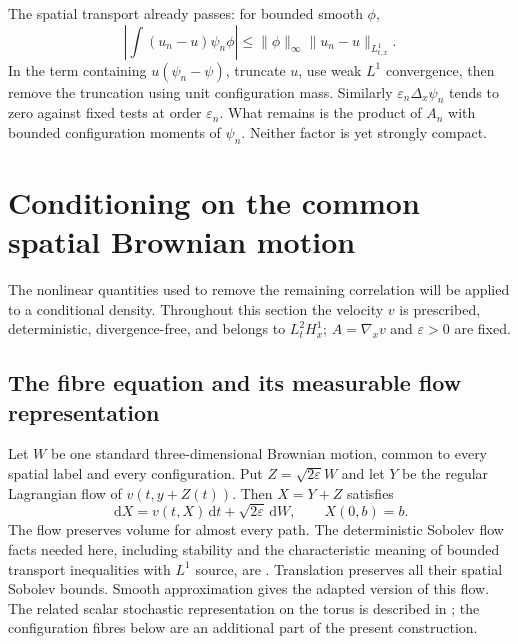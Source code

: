 \documentclass[11pt]{article}
\numberwithin{equation}{section}
\newcommand{\dd}{\,\mathrm d}
\newcommand{\grad}{\nabla}
\begin{document}
The spatial transport already passes: for bounded smooth $\phi$,
\[
 \left|\int(u_n-u)\psi_n\phi\right|\leq
 \|\phi\|_\infty\|u_n-u\|_{L^1_{t,x}}.
\]
In the term containing $u(\psi_n-\psi)$, truncate $u$, use weak $L^1$
convergence, then remove the truncation using unit configuration mass.
Similarly $\varepsilon_n\Delta_x\psi_n$ tends to zero against fixed tests at
order $\varepsilon_n$. What remains is the product of $A_n$ with bounded
configuration moments of $\psi_n$. Neither factor is yet strongly compact.

\section{Conditioning on the common spatial Brownian motion}\label{sec:lift}
The nonlinear quantities used to remove the remaining correlation will be
applied to a conditional density. Throughout this section the velocity $v$ is
prescribed, deterministic, divergence-free, and belongs to $L^2_tH^1_x$;
$A=\grad_xv$ and $\varepsilon>0$ are fixed.

\subsection{The fibre equation and its measurable flow representation}
Let $W$ be one standard three-dimensional Brownian motion, common to every
spatial label and every configuration. Put $Z=\sqrt{2\varepsilon}W$ and let
$Y$ be the regular Lagrangian flow of $v(t,y+Z(t))$. Then $X=Y+Z$ satisfies
\begin{equation}\label{eq:SDE}
 \dd X=v(t,X)\dd t+\sqrt{2\varepsilon}\dd W,
 \qquad X(0,b)=b.
\end{equation}
The flow preserves volume for almost every path. The deterministic Sobolev
flow facts needed here, including stability and the characteristic meaning of
bounded transport inequalities with $L^1$ source, are
\cite[Appendix~A]{Masmoudi}. Translation preserves all their spatial Sobolev
bounds. Smooth approximation gives the adapted version of this flow. The
related scalar stochastic representation on the torus is described in
\cite[Section~3.3]{BCC}; the configuration fibres below are an additional
part of the present construction.
\end{document}
